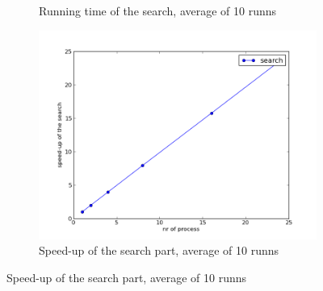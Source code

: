 \documentclass[a4paper,10pt]{article}
\begin{document}
\begin{figure}[h!]
\begin{subfigure}[b]{0.48\textwidth}
                \caption{Running time of the search, average of 10 runns}
                \label{fig:tiger}
        \end{subfigure}
        \begin{subfigure}[b]{0.48\textwidth}
                \centering
                \includegraphics[width=\textwidth]{graphics/openmp_search_speedup.png}
                \caption{Speed-up of the search part, average of 10 runns}
                \label{fig:a}
        \end{subfigure}
\end{figure}
\end{document}
